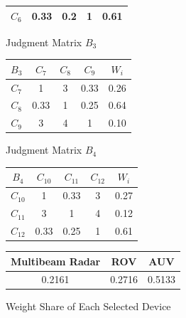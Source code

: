 \documentclass[12pt]{article}
\begin{document}
\begin{figure}[ht]
\begin{minipage}{0.45\textwidth}
\begin{tabular}{ccccc}
            $C_{6}$ & 0.33    & 0.2     & 1       & 0.61    \\
            \bottomrule
        \end{tabular}
    \end{minipage}
    \begin{minipage}{0.45\textwidth}
        \centering
        \caption{Judgment Matrix $B_{3}$}
        \label{tab:judgment_matrix_3}
        \begin{tabular}{ccccc}
            \toprule
            $B_{3}$ & $C_{7}$ & $C_{8}$ & $C_{9}$ & $W_{i} $ \\
            \midrule
            $C_{7}$ & 1       & 3       & 0.33    & 0.26     \\
            $C_{8}$ & 0.33    & 1       & 0.25    & 0.64     \\
            $C_{9}$ & 3       & 4       & 1       & 0.10     \\
            \bottomrule
        \end{tabular}
    \end{minipage}
    \begin{minipage}{0.45\textwidth}
        \centering
        \caption{Judgment Matrix $B_{4}$}
        \label{tab:judgment_matrix_4}
        \vspace{.4cm}
        \begin{tabular}{ccccc}
            \toprule
            $B_{4}$  & $C_{10}$ & $C_{11}$ & $C_{12}$ & $W_{i}$ \\
            \midrule
            $C_{10}$ & 1        & 0.33     & 3        & 0.27    \\
            $C_{11}$ & 3        & 1        & 4        & 0.12    \\
            $C_{12}$ & 0.33     & 0.25     & 1        & 0.61    \\
            \bottomrule
        \end{tabular}
    \end{minipage}
    \begin{minipage}{0.45\textwidth}
        \centering
        \caption{Weight Share of Each Selected Device}
        \label{tab:weight_share}
        \begin{tabular}{ccc}
            \toprule
            Multibeam Radar & ROV    & AUV    \\ \midrule
            0.2161          & 0.2716 & 0.5133 \\ \bottomrule
        \end{tabular}
    \end{minipage}
\end{figure}
\end{document}
